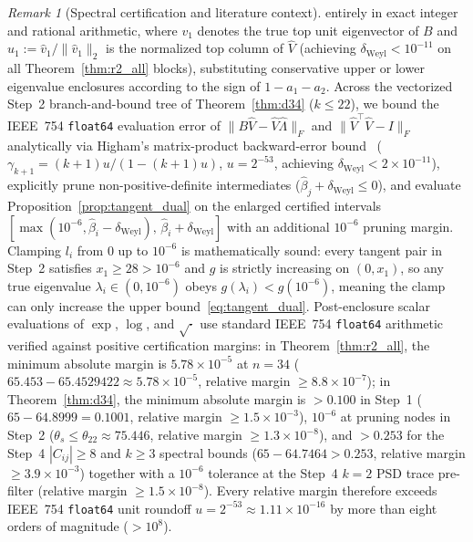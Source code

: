 \documentclass[11pt]{article}
\theoremstyle{remark}
\newtheorem{remark}{Remark}
\begin{document}
\begin{remark}[Spectral certification and literature context]
entirely in exact integer and rational arithmetic, where $v_1$ denotes the true top unit eigenvector of $B$ and $u_1 := \hat{v}_1 / \|\hat{v}_1\|_2$ is the normalized top column of $\hat{V}$ (achieving $\delta_{\mathrm{Weyl}} < 10^{-11}$ on all Theorem~\ref{thm:r2_all} blocks), substituting conservative upper or lower eigenvalue enclosures according to the sign of $1 - a_1 - a_2$. Across the vectorized Step~2 branch-and-bound tree of Theorem~\ref{thm:d34} ($k \le 22$), we bound the IEEE~754 \texttt{float64} evaluation error of $\|B\hat{V} - \hat{V}\hat{\Lambda}\|_F$ and $\|\hat{V}^\top\hat{V} - I\|_F$ analytically via Higham's matrix-product backward-error bound~\cite[\S3.5]{higham2002} ($\gamma_{k+1} = (k+1)u/(1 - (k+1)u)$, $u = 2^{-53}$, achieving $\delta_{\mathrm{Weyl}} < 2 \times 10^{-11}$), explicitly prune non-positive-definite intermediates ($\hat{\beta}_j + \delta_{\mathrm{Weyl}} \le 0$), and evaluate Proposition~\ref{prop:tangent_dual} on the enlarged certified intervals $[\max(10^{-6}, \hat{\beta}_i - \delta_{\mathrm{Weyl}}),\, \hat{\beta}_i + \delta_{\mathrm{Weyl}}]$ with an additional $10^{-6}$ pruning margin. Clamping $l_i$ from $0$ up to $10^{-6}$ is mathematically sound: every tangent pair in Step~2 satisfies $x_1 \ge 28 > 10^{-6}$ and $g$ is strictly increasing on $(0, x_1)$, so any true eigenvalue $\lambda_i \in (0, 10^{-6})$ obeys $g(\lambda_i) < g(10^{-6})$, meaning the clamp can only increase the upper bound~\eqref{eq:tangent_dual}. Post-enclosure scalar evaluations of $\exp$, $\log$, and $\sqrt{\cdot}$ use standard IEEE~754 \texttt{float64} arithmetic verified against positive certification margins: in Theorem~\ref{thm:r2_all}, the minimum absolute margin is $5.78 \times 10^{-5}$ at $n = 34$ ($65.453 - 65.4529422 \approx 5.78 \times 10^{-5}$, relative margin $\ge 8.8 \times 10^{-7}$); in Theorem~\ref{thm:d34}, the minimum absolute margin is $> 0.100$ in Step~1 ($65 - 64.8999 = 0.1001$, relative margin $\ge 1.5 \times 10^{-3}$), $10^{-6}$ at pruning nodes in Step~2 ($\theta_s \le \theta_{22} \approx 75.446$, relative margin $\ge 1.3 \times 10^{-8}$), and $> 0.253$ for the Step~4 $|C_{ij}| \ge 8$ and $k \ge 3$ spectral bounds ($65 - 64.7464 > 0.253$, relative margin $\ge 3.9 \times 10^{-3}$) together with a $10^{-6}$ tolerance at the Step~4 $k = 2$ PSD trace pre-filter (relative margin $\ge 1.5 \times 10^{-8}$). Every relative margin therefore exceeds IEEE~754 \texttt{float64} unit roundoff $u = 2^{-53} \approx 1.11 \times 10^{-16}$ by more than eight orders of magnitude ($> 10^8$).


\end{remark}
\end{document}
